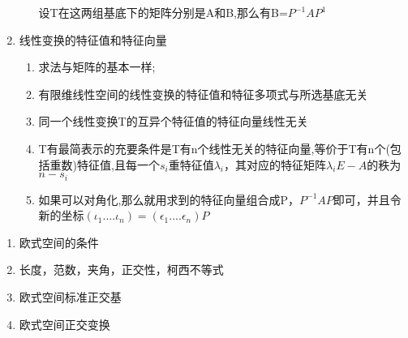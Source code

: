 \documentclass[11pt, a4paper, UTF8]{ctexart}
\begin{document}
\begin{solution}
\begin{enumerate}
\begin{enumerate}
      设T在这两组基底下的矩阵分别是A和B,那么有B=$P^{-1}AP^{1}$
    \end{enumerate}
    \item 线性变换的特征值和特征向量
    \begin{enumerate}
      \item 求法与矩阵的基本一样;
      \item 有限维线性空间的线性变换的特征值和特征多项式与所选基底无关
      \item 同一个线性变换T的互异个特征值的特征向量线性无关
      \item T有最简表示的充要条件是T有n个线性无关的特征向量,等价于T有n个(包括重数)特征值,且每一个$s_i$重特征值$\lambda _i$，其对应的特征矩阵$\lambda _i E -A$的秩为$n-s_i$
      \item 如果可以对角化,那么就用求到的特征向量组合成P，$P^{-1}AP$即可，并且令新的坐标$(\iota _1....\iota _n)=(\epsilon _1....\epsilon _n)P$
    \end{enumerate}
  \end{enumerate}
\end{solution}
\begin{problem}[内积空间]
  \begin{enumerate}
  \item 欧式空间的条件
  \item 长度，范数，夹角，正交性，柯西不等式
  \item 欧式空间标准正交基
  \item 欧式空间正交变换
  \end{enumerate}
\end{problem}
\end{document}
